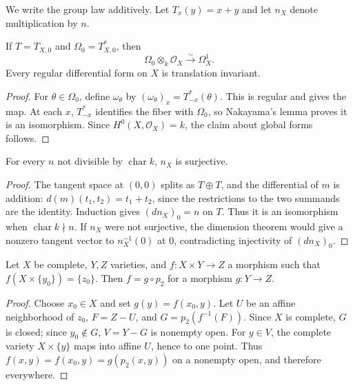 We write the group law additively. Let $T_x(y)=x+y$ and let $n_X$ denote
multiplication by $n$.

\begin{proposition}
\label{mumford-source-invariant-differentials}
If $T=T_{X,0}$ and $\Omega_0=T^*_{X,0}$, then
\[
 \Omega_0\otimes_k\mathcal O_X\xrightarrow{\sim}\Omega_X^1.
\]
Every regular differential form on $X$ is translation invariant.
\end{proposition}
\begin{proof}
For $\theta\in\Omega_0$, define $\omega_\theta$ by
$(\omega_\theta)_x=T^*_{-x}(\theta)$. This is regular and gives the map.
At each $x$, $T^*_{-x}$ identifies the fiber with $\Omega_0$, so Nakayama's
lemma proves it is an isomorphism. Since $H^0(X,\mathcal O_X)=k$, the claim
about global forms follows.
\end{proof}

\begin{theorem}
\label{mumford-prop-multiplication-n}
For every $n$ not divisible by $\operatorname{char}k$, $n_X$ is surjective.
\end{theorem}
\begin{proof}
The tangent space at $(0,0)$ splits as $T\oplus T$, and the differential of
$m$ is addition: $d(m)(t_1,t_2)=t_1+t_2$, since the restrictions to the two
summands are the identity. Induction gives $(dn_X)_0=n$ on $T$. Thus it is an
isomorphism when $\operatorname{char}k\nmid n$. If $n_X$ were not surjective,
the dimension theorem would give a nonzero tangent vector to
$n_X^{-1}(0)$ at $0$, contradicting injectivity of $(dn_X)_0$.
\end{proof}

\begin{lemma}
\label{mumford-lem-rigidity-form-I}
Let $X$ be complete, $Y,Z$ varieties, and $f:X\times Y\to Z$ a morphism such
that $f(X\times\{y_0\})=\{z_0\}$. Then $f=g\circ p_2$ for a morphism
$g:Y\to Z$.
\leanok
\end{lemma}
\begin{proof}
Choose $x_0\in X$ and set $g(y)=f(x_0,y)$. Let $U$ be an affine neighborhood
of $z_0$, $F=Z-U$, and $G=p_2(f^{-1}(F))$. Since $X$ is complete, $G$ is
closed; since $y_0\notin G$, $V=Y-G$ is nonempty open. For $y\in V$, the
complete variety $X\times\{y\}$ maps into affine $U$, hence to one point.
Thus $f(x,y)=f(x_0,y)=g(p_2(x,y))$ on a nonempty open, and therefore everywhere.
\leanok
\end{proof}

